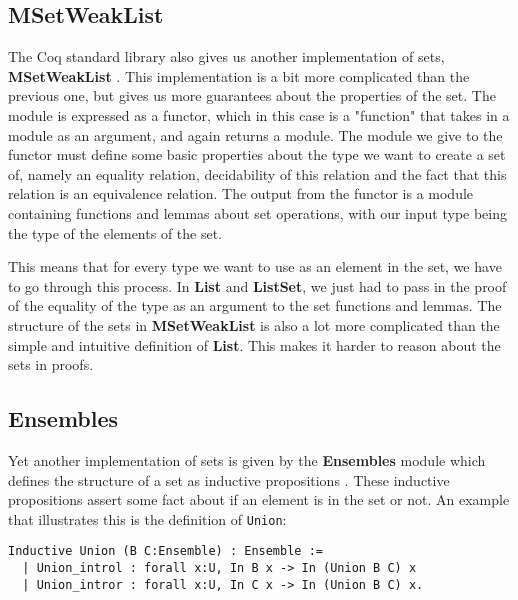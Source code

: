 \subsection{MSetWeakList}
\label{ssec:msetweaklist}

The Coq standard library also gives us another implementation of sets, \textbf{MSetWeakList} \cite{msetweaklist}.
This implementation is a bit more complicated than the previous one,
but gives us more guarantees about the properties of the set.
The module is expressed as a functor, which in this case is a "function" that takes in a module as an argument, and again returns a module.
The module we give to the functor must define some basic properties about the type we want to create a set of,
namely an equality relation, decidability of this relation and the fact that this relation is an equivalence relation.
The output from the functor is a module containing functions and lemmas about set operations,
with our input type being the type of the elements of the set.

This means that for every type we want to use as an element in the set, we have to go through this process.
In \textbf{List} and \textbf{ListSet}, we just had to pass in the proof of the equality of the type as an argument to the set functions and lemmas.
The structure of the sets in \textbf{MSetWeakList} is also a lot more complicated than the simple and intuitive definition of \textbf{List}.
This makes it harder to reason about the sets in proofs.

\subsection{Ensembles}
\label{ssec:ensembles}

Yet another implementation of sets is given by the \textbf{Ensembles} module
which defines the structure of a set as inductive propositions \cite{coqensembles}.
These inductive propositions assert some fact about if an element is in the set or not.
An example that illustrates this is the definition of \lstinline{Union}:

\begin{minipage}{\linewidth}
\begin{lstlisting}[language=Coq, label={lst:union_ensemble}, caption={\lstinline{Union} in \textbf{Ensembles} module}]
Inductive Union (B C:Ensemble) : Ensemble :=
  | Union_introl : forall x:U, In B x -> In (Union B C) x
  | Union_intror : forall x:U, In C x -> In (Union B C) x.
\end{lstlisting}
\end{minipage}

